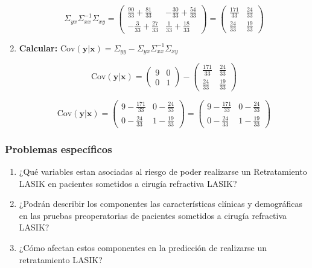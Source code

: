 \begin{enumerate}
    $$
    \Sigma_{yx} \Sigma_{xx}^{-1} \Sigma_{xy} =
    \begin{pmatrix}
    \frac{90}{33}+\frac{81}{33} & -\frac{30}{33}+\frac{54}{33} \\
    -\frac{3}{33}+\frac{27}{33} & \frac{1}{33}+\frac{18}{33}
    \end{pmatrix} =
    \begin{pmatrix}
    \frac{171}{33} & \frac{24}{33} \\
    \frac{24}{33} & \frac{19}{33}
    \end{pmatrix}
    $$

    \item \textbf{Calcular: }$\text{Cov}(\mathbf{y}|\mathbf{x}) =
\Sigma_{yy} - \Sigma_{yx} \Sigma_{xx}^{-1} \Sigma_{xy}$

    $$
    \text{Cov}(\mathbf{y}|\mathbf{x}) =
    \begin{pmatrix}
    9 & 0 \\
    0 & 1
    \end{pmatrix}
    -
    \begin{pmatrix}
    \frac{171}{33} & \frac{24}{33} \\
    \frac{24}{33} & \frac{19}{33}
    \end{pmatrix}
    $$

    $$
    \text{Cov}(\mathbf{y}|\mathbf{x}) =
    \begin{pmatrix}
    9-\frac{171}{33} & 0 - \frac{24}{33} \\
    0- \frac{24}{33} & 1 - \frac{19}{33} 
    \end{pmatrix} =
    \begin{pmatrix}
    9-\frac{171}{33} & 0 - \frac{24}{33} \\
    0- \frac{24}{33} & 1 - \frac{19}{33} 
    \end{pmatrix}
    
    $$

\end{enumerate}

 
\subsubsection{Problemas específicos}

\begin{enumerate}

	\item ¿Qué variables estan asociadas al riesgo de poder realizarse un Retratamiento LASIK en pacientes sometidos a cirugía refractiva LASIK?
 
	\item ¿Podrán describir los componentes las características clínicas y demográficas en las pruebas preoperatorias de pacientes sometidos a cirugía refractiva LASIK?

    \item ¿Cómo afectan estos componentes en la predicción de realizarse un retratamiento LASIK?

\end{enumerate}

